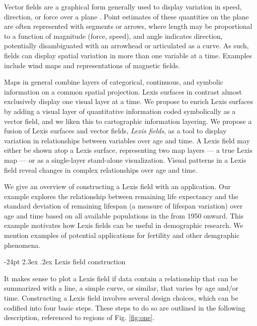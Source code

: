 \documentclass[10pt, twoside, parskip=half]{article}
\makeatletter
\renewcommand\section{\@startsection {section}{1}{\z@}%
                                   {-24pt}%
                                   {2.3ex \@plus.2ex}%
                                   {\normalfont\large\bfseries}}
\makeatother
\begin{document}
Vector fields are a graphical form generally used to display variation in speed, direction, or force over a plane \citep{weiskopf2007vector}. Point estimates of these quantities on the plane are often represented with segments or arrows, where length may be proportional to a function of magnitude (force, speed), and angle indicates direction, potentially disambiguated with an arrowhead or articulated as a curve. As such, fields can display spatial variation in more than one variable at a time. Examples include wind maps and representations of magnetic fields.

Maps in general combine layers of categorical, continuous, and symbolic information on a common spatial projection. Lexis surfaces in contrast almost exclusively display one visual layer at a time. We propose to enrich Lexis surfaces by adding a visual layer of quantitative information coded symbolically as a vector field, and we liken this to cartographic information layering. We propose a fusion of Lexis surfaces and vector fields, \emph{Lexis fields}, as a tool to display variation in relationships between variables over age and time. A Lexis field may either be shown atop a Lexis surface, representing two map layers --- a true Lexis map --- or as a single-layer stand-alone visualization. Visual patterns in a Lexis field reveal changes in complex relationships over age and time.

We give an overview of constructing a Lexis field with an application. Our example explores the relationship between remaining life expectancy and the standard deviation of remaining lifespan (a measure of lifespan variation) over age and time based on all available populations in the \citet{HMD} from 1950 onward. This example motivates how Lexis fields can be useful in demographic research. We mention examples of potential applications for fertility and other demgraphic phenomena.

\hypertarget{lexis-field-construction}{%
\section{Lexis field construction}\label{lexis-field-construction}}

It makes sense to plot a Lexis field if data contain a relationship that can be summarized with a line, a simple curve, or similar, that varies by age and/or time. Constructing a Lexis field involves several design choices, which can be codified into four basic steps. These steps to do so are outlined in the following description, referenced to regions of Fig. \ref{fig:one}.
\end{document}
